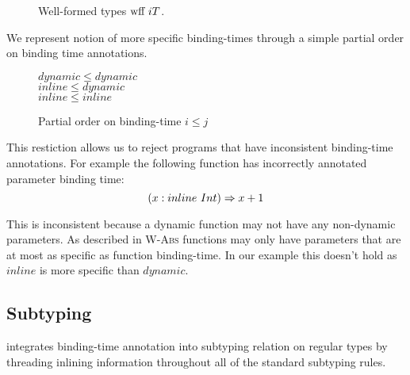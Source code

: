 \begin{figure}[H]

  {}

  {}

  {}
\caption{Well-formed types $\text{wff}\ i T$.}
\end{figure}

We represent notion of more specific binding-times through
a simple partial order on binding time annotations.

\begin{figure}[H]
  \begin{center}
  $ dynamic \leq dynamic $ \\
  $ inline  \leq dynamic $ \\
  $ inline  \leq inline  $
  \end{center}
\caption{Partial order on binding-time $i \leq j$}
\end{figure}

This restiction allows us to reject programs that have inconsistent binding-time annotations.
For example the following function has incorrectly annotated parameter binding time:
\begin{equation}\nonumber
    (x: inline\ Int) \Rightarrow x + 1
\end{equation}

This is inconsistent because a dynamic function may not have any non-dynamic parameters.
As described in \textsc{W-Abs} functions may only have parameters that are at most as specific
as function binding-time. In our example this doesn't hold as $inline$ is more
specific than $dynamic$.

\subsection{Subtyping}

\calculus integrates binding-time annotation into subtyping relation on regular types by
threading inlining information throughout all of the standard subtyping rules.

